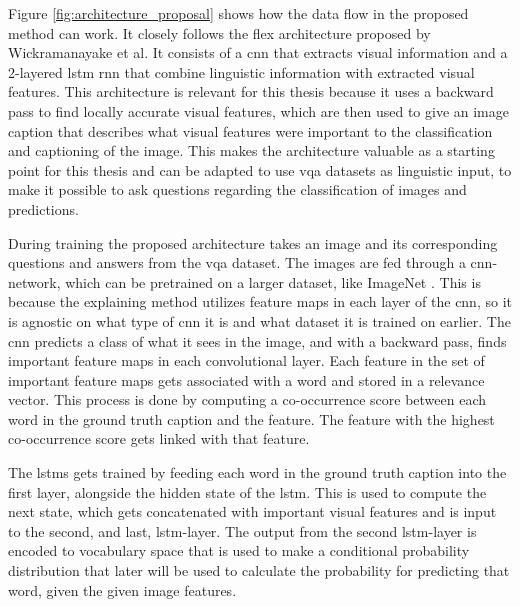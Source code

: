         Figure \ref{fig:architecture_proposal} shows how the data flow in the proposed method can work. It closely follows the \gls{flex} \cite{wickramanayakeFLEXFaithfulLinguistic2019} architecture proposed by Wickramanayake et al. It consists of a \gls{cnn} that extracts visual information and a 2-layered \gls{lstm} \cite{hochreiterLongShorttermMemory1997} \gls{rnn} that combine linguistic information with extracted visual features. This architecture is relevant for this thesis because it uses a backward pass to find locally accurate visual features, which are then used to give an image caption that describes what visual features were important to the classification and captioning of the image. This makes the architecture valuable as a starting point for this thesis and can be adapted to use \gls{vqa} datasets as linguistic input, to make it possible to ask questions regarding the classification of images and predictions. 
        
        During training the proposed architecture takes an image and its corresponding questions and answers from the \gls{vqa} dataset. The images are fed through a \gls{cnn}-network, which can be pretrained on a larger dataset, like ImageNet \cite{dengImageNetLargeScaleHierarchical2009}. This is because the explaining method utilizes feature maps in each layer of the \gls{cnn}, so it is agnostic on what type of \gls{cnn} it is and what dataset it is trained on earlier. The \gls{cnn} predicts a class of what it sees in the image, and with a backward pass, finds important feature maps in each  convolutional layer. Each feature in the set of important feature maps gets associated with a word and stored in a relevance vector. This process is done by computing a co-occurrence score between each word in the ground truth caption and the feature. The feature with the highest co-occurrence score gets linked with that feature. 
        
        The \glspl{lstm} gets trained by feeding each word in the ground truth caption into the first layer, alongside the hidden state of the \gls{lstm}. This is used to compute the next state, which gets concatenated with important visual features and is input to the second, and last, \gls{lstm}-layer. 
        The output from the second \gls{lstm}-layer is encoded to vocabulary space that is used to make a conditional probability distribution that later will be used to calculate the probability for predicting that word, given the given image features. 
        
